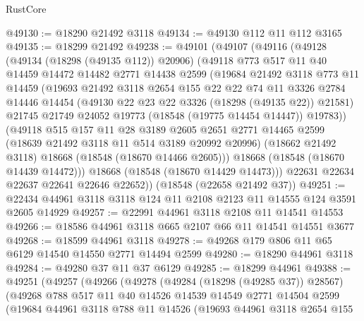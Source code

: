 \begin{lexlean}{RustCore}
\begin{coremodule}
@49130 := @18290 @21492 @3118
@49134 := @49130 @112 @11 @112 @3165
@49135 := @18299 @21492
@49238 := @49101
    (@49107
      (@49116
        (@49128
          (@49134 (@18298 (@49135 @112)) @20906)
          (@49118
            @773
            @517
            @11
            @40
            @14459
            @14472
            @14482
            @2771
            @14438
            @2599
            (@19684
              @21492
              @3118
              @773
              @11
              @14459
              (@19693
                @21492
                @3118
                @2654
                @155
                @22
                @22
                @74
                @11
                @3326
                @2784
                @14446
                @14454
                (@49130 @22 @23 @22 @3326 (@18298 (@49135 @22)) @21581)
                @21745
                @21749
                @24052
                @19773
                (@18548 (@19775 @14454 @14447))
                @19783))
            (@49118
              @515
              @157
              @11
              @28
              @3189
              @2605
              @2651
              @2771
              @14465
              @2599
              (@18639 @21492 @3118 @11 @514 @3189 @20992 @20996)
              (@18662 @21492 @3118)
              @18668
              (@18548 (@18670 @14466 @2605)))
            @18668
            (@18548 (@18670 @14439 @14472)))
          @18668
          (@18548 (@18670 @14429 @14473)))
        @22631
        @22634
        @22637
        @22641
        @22646
        @22652))
    (@18548 (@22658 @21492 @37))
@49251 := @22434 @44961 @3118 @3118 @124 @11 @2108 @2123 @11 @14555 @124 @3591 @2605 @14929
@49257 := @22991 @44961 @3118 @2108 @11 @14541 @14553
@49266 := @18586 @44961 @3118 @665 @2107 @66 @11 @14541 @14551 @3677
@49268 := @18599 @44961 @3118
@49278 := @49268 @179 @806 @11 @65 @6129 @14540 @14550 @2771 @14494 @2599
@49280 := @18290 @44961 @3118
@49284 := @49280 @37 @11 @37 @6129
@49285 := @18299 @44961
@49388 := @49251
    (@49257
      (@49266
        (@49278
          (@49284 (@18298 (@49285 @37)) @28567)
          (@49268
            @788
            @517
            @11
            @40
            @14526
            @14539
            @14549
            @2771
            @14504
            @2599
            (@19684
              @44961
              @3118
              @788
              @11
              @14526
              (@19693
                @44961
                @3118
                @2654
                @155

\end{coremodule}
\end{lexlean}
